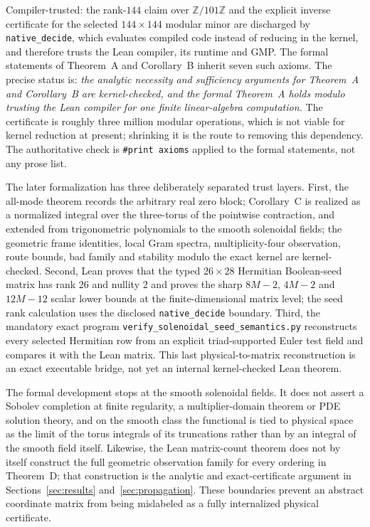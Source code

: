\documentclass[11pt]{article}
\theoremstyle{definition}
\theoremstyle{remark}
\theoremstyle{plain}
\newcommand{\Z}{\mathbb{Z}}
\begin{document}
Compiler-trusted: the rank-$144$ claim over $\Z/101\Z$ and the explicit inverse
certificate for the selected $144\times144$ modular minor are discharged by
\texttt{native\_decide}, which evaluates compiled code instead of reducing in
the kernel, and therefore trusts the Lean compiler, its runtime and GMP. The
formal statements of Theorem~A and Corollary~B inherit seven such axioms. The
precise status is: \emph{the analytic necessity and sufficiency arguments
for Theorem~A and Corollary~B are kernel-checked, and the formal
Theorem~A holds modulo trusting the Lean compiler for one finite
linear-algebra computation.} The certificate is roughly three million modular
operations, which is not viable for kernel reduction at present; shrinking it
is the route to removing this dependency. The authoritative check is
\texttt{\#print axioms} applied to the formal statements, not any prose list.

The later formalization has three deliberately separated trust layers. First,
the all-mode theorem records the arbitrary real zero block; Corollary~C is
realized as a normalized integral over the three-torus of the pointwise
contraction, and extended from trigonometric polynomials to the smooth
solenoidal fields; the geometric frame identities, local Gram spectra,
multiplicity-four observation, route bounds, bad family and stability modulo
the exact kernel are kernel-checked. Second, Lean proves that the typed
$26\times28$ Hermitian Boolean-seed matrix has rank $26$ and nullity $2$ and
proves the sharp $8M-2$, $4M-2$ and $12M-12$ scalar lower bounds at the
finite-dimensional matrix level; the seed rank calculation uses the disclosed
\texttt{native\_decide} boundary. Third, the mandatory exact program
\texttt{verify\_solenoidal\_seed\_semantics.py} reconstructs every selected
Hermitian row from an explicit triad-supported Euler test field and compares
it with the Lean matrix. This last physical-to-matrix reconstruction is an
exact executable bridge, not yet an internal kernel-checked Lean theorem.

The formal development stops at the smooth solenoidal fields. It does not
assert a Sobolev completion at finite regularity, a multiplier-domain theorem
or PDE solution theory, and on the smooth class the functional is tied to
physical space as the limit of the torus integrals of its truncations rather
than by an integral of the smooth field itself.
Likewise, the Lean matrix-count theorem does not by itself construct the full
geometric observation family for every ordering in Theorem~D; that construction
is the analytic and exact-certificate argument in Sections~\ref{sec:results}
and~\ref{sec:propagation}. These boundaries prevent an abstract coordinate
matrix from being mislabeled as a fully internalized physical certificate.
\end{document}
